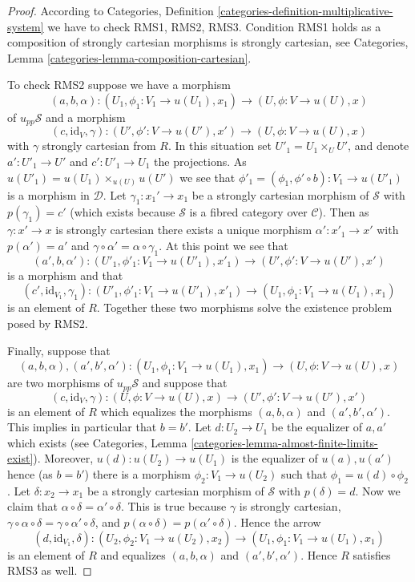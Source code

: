 \begin{proof}
According to
Categories, Definition \ref{categories-definition-multiplicative-system}
we have to check RMS1, RMS2, RMS3.
Condition RMS1 holds as a composition of strongly cartesian morphisms is
strongly cartesian, see
Categories, Lemma \ref{categories-lemma-composition-cartesian}.

\medskip\noindent
To check RMS2 suppose we have a morphism
$$
(a, b, \alpha) :
(U_1, \phi_1 : V_1 \to u(U_1), x_1)
\longrightarrow
(U, \phi : V \to u(U), x)
$$
of $u_{pp}\mathcal{S}$ and a morphism
$$
(c, \text{id}_V, \gamma) :
(U', \phi' : V \to u(U'), x')
\longrightarrow
(U, \phi : V \to u(U), x)
$$
with $\gamma$ strongly cartesian from $R$. In this situation set
$U'_1 = U_1 \times_U U'$, and denote $a' : U'_1 \to U'$ and
$c' : U'_1 \to U_1$ the projections.
As $u(U'_1) = u(U_1) \times_{u(U)} u(U')$
we see that $\phi'_1 = (\phi_1, \phi' \circ b) : V_1 \to u(U'_1)$ is
a morphism in $\mathcal{D}$. Let $\gamma_1 : x_1' \to x_1$
be a strongly cartesian morphism of $\mathcal{S}$ with
$p(\gamma_1) = c'$ (which exists because $\mathcal{S}$ is a
fibred category over $\mathcal{C}$). Then as $\gamma : x' \to x$ is
strongly cartesian there exists a unique morphism
$\alpha' : x'_1 \to x'$ with $p(\alpha') = a'$ and
$\gamma \circ \alpha' = \alpha \circ \gamma_1$.
At this point we see that
$$
(a', b, \alpha') :
(U'_1, \phi'_1 : V_1 \to u(U'_1), x'_1)
\longrightarrow
(U', \phi' : V \to u(U'), x')
$$
is a morphism and that
$$
(c', \text{id}_{V_1}, \gamma_1) :
(U'_1, \phi'_1 : V_1 \to u(U'_1), x'_1)
\longrightarrow
(U_1, \phi_1 : V_1 \to u(U_1), x_1)
$$
is an element of $R$. Together these two morphisms solve the existence
problem posed by RMS2.

\medskip\noindent
Finally, suppose that
$$
(a, b, \alpha), (a', b', \alpha') :
(U_1, \phi_1 : V_1 \to u(U_1), x_1)
\longrightarrow
(U, \phi : V \to u(U), x)
$$
are two morphisms of $u_{pp}\mathcal{S}$ and suppose that
$$
(c, \text{id}_V, \gamma) :
(U, \phi : V \to u(U), x)
\longrightarrow
(U', \phi' : V \to u(U'), x')
$$
is an element of $R$ which equalizes the morphisms
$(a, b, \alpha)$ and $(a', b', \alpha')$. This implies in particular
that $b = b'$. Let $d : U_2 \to U_1$ be the equalizer of $a, a'$ which
exists (see
Categories, Lemma \ref{categories-lemma-almost-finite-limits-exist}).
Moreover, $u(d) : u(U_2) \to u(U_1)$ is the equalizer of $u(a), u(a')$
hence (as $b = b'$) there is a morphism $\phi_2 : V_1 \to u(U_2)$ such that
$\phi_1 = u(d) \circ \phi_2$. Let $\delta : x_2 \to x_1$ be a strongly
cartesian morphism of $\mathcal{S}$ with $p(\delta) = d$.
Now we claim that $\alpha \circ \delta = \alpha' \circ \delta$.
This is true because
$\gamma$ is strongly cartesian,
$\gamma \circ \alpha \circ \delta = \gamma \circ \alpha' \circ \delta$, and
$p(\alpha \circ \delta) = p(\alpha' \circ \delta)$.
Hence the arrow
$$
(d, \text{id}_{V_1}, \delta) :
(U_2, \phi_2 : V_1 \to u(U_2), x_2)
\longrightarrow
(U_1, \phi_1 : V_1 \to u(U_1), x_1)
$$
is an element of $R$ and equalizes $(a, b, \alpha)$ and $(a', b', \alpha')$.
Hence $R$ satisfies RMS3 as well.
\end{proof}


